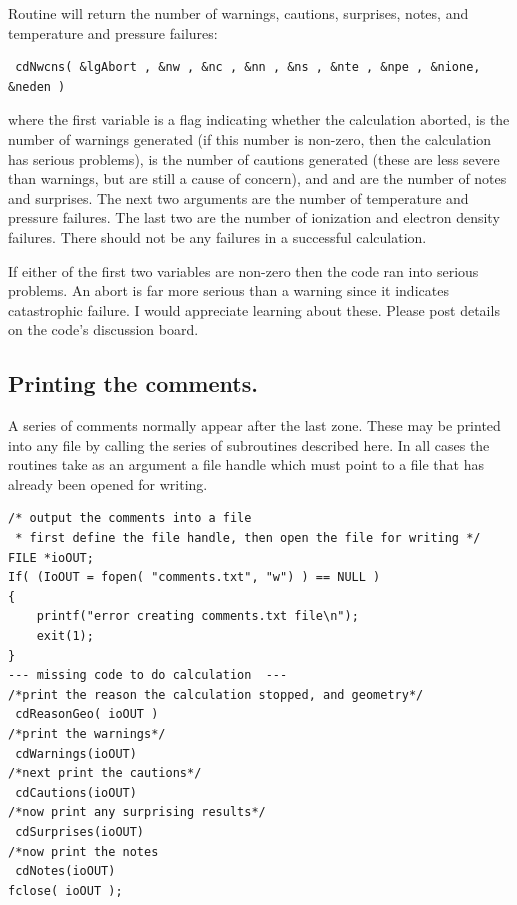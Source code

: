 Routine  will return the number of warnings, cautions, surprises,
notes, and temperature and pressure failures:
\begin{verbatim}
 cdNwcns( &lgAbort , &nw , &nc , &nn , &ns , &nte , &npe , &nione, &neden )
\end{verbatim}
where the first variable is a  flag indicating whether the calculation
aborted,  is the number of warnings generated (if this number is non-zero,
then the calculation has serious problems),  is the number of cautions
generated (these are less severe than warnings, but are still a cause of
concern), and  and  are the number of notes and surprises.
The next
two arguments are the number of temperature and pressure failures.
The
last two are the number of ionization and electron density failures.  There
should not be any failures in a successful calculation.

If either of the first two variables are non-zero then the code ran into
serious problems.  An abort is far more serious than a warning since it
indicates catastrophic failure.  I would appreciate learning about these.
Please post details on the code's discussion board.

\subsection{Printing the comments.}

A series of comments normally appear after the last zone.  These may
be printed into any file by calling the series of subroutines described
here.  In all cases the routines take as an argument a file handle which
must point to a file that has already been opened for writing.
\begin{verbatim}
/* output the comments into a file
 * first define the file handle, then open the file for writing */
FILE *ioOUT;
If( (IoOUT = fopen( "comments.txt", "w") ) == NULL )
{
    printf("error creating comments.txt file\n");
    exit(1);
}
--- missing code to do calculation  ---
/*print the reason the calculation stopped, and geometry*/
 cdReasonGeo( ioOUT )
/*print the warnings*/
 cdWarnings(ioOUT)
/*next print the cautions*/
 cdCautions(ioOUT)
/*now print any surprising results*/
 cdSurprises(ioOUT)
/*now print the notes
 cdNotes(ioOUT)
fclose( ioOUT );
\end{verbatim}

